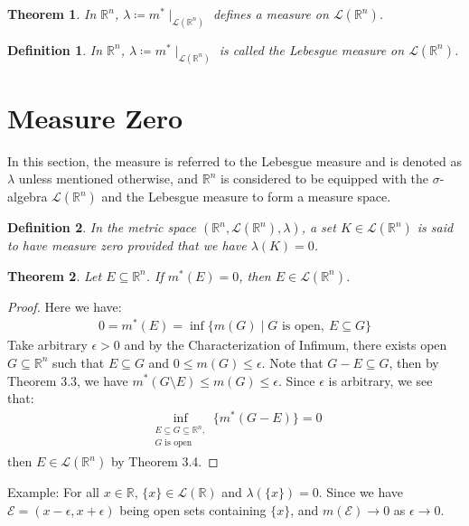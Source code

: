 \documentclass[11pt]{book}
\theoremstyle{break}
\theoremstyle{break}
\newtheorem{thm}{Theorem}[section]
\newtheorem{defn}{Definition}[corL]
\newcommand{\R}{\mathbb{R}}
\newcommand{\example}{\color{green}Example: \color{black}}
\begin{document}
\begin{thm}
In $\R^n$, $\lambda\coloneqq m^* \mid_{\mathcal{L}(\R^n)}$ defines a measure on $\mathcal{L}(\R^n)$.
\end{thm}

\begin{defn}
In $\R^n$, $\lambda\coloneqq m^* \mid_{\mathcal{L}(\R^n)}$ is called the Lebesgue measure on $\mathcal{L}(\R^n)$.
\end{defn}


\newpage
\section[Measure Zero]{\color{red} Measure Zero\color{black}}

In this section, the measure is referred to the Lebesgue measure and is denoted as $\lambda$ unless mentioned otherwise, and $\R^n$ is considered to be equipped with the $\sigma$-algebra $\mathcal{L}(\R^n)$ and the Lebesgue measure to form a measure space.  \\

\begin{defn}
In the metric space $(\R^n, \mathcal{L}(\R^n), \lambda)$, a set $K \in \mathcal{L}(\R^n)$ is said to have measure zero provided that we have $\lambda(K) = 0$. 
\end{defn}

\begin{thm}
Let $E \subseteq \R^n$. If $m^*(E) = 0$, then $E \in \mathcal{L}(\R^n)$. 
\end{thm}
\begin{proof}
Here we have:
\begin{align*}
0 = m^*(E) = \inf\{ m(G) \mid G\text{ is open},\ E \subseteq G\}
\end{align*}
Take arbitrary $\epsilon>0$ and by the Characterization of Infimum, there exists open $G\subseteq \R^n$ such that $E \subseteq G$ and $0 \leq m(G) \leq \epsilon$. Note that $G-E \subseteq G$, then by Theorem 3.3, we have $m^*(G\setminus E) \leq m(G) \leq \epsilon$. Since $\epsilon$ is arbitrary, we see that:
\begin{align*}
\inf_{\substack{E\subseteq G \subseteq \R^n, \\ G \text{ is open}}} \{ m^*(G- E)\} = 0
\end{align*}
then $E \in \mathcal{L}(\R^n)$ by Theorem 3.4.
\end{proof}

\example For all $x \in \R$, $\{x\} \in \mathcal{L}(\R)$ and $\lambda(\{x\}) = 0$. Since we have $\mathcal{E}= (x-\epsilon, x+\epsilon)$ being open sets containing $\{x\}$, and $m(\mathcal{E}) \to 0$ as $\epsilon \to 0$. \\
\end{document}
